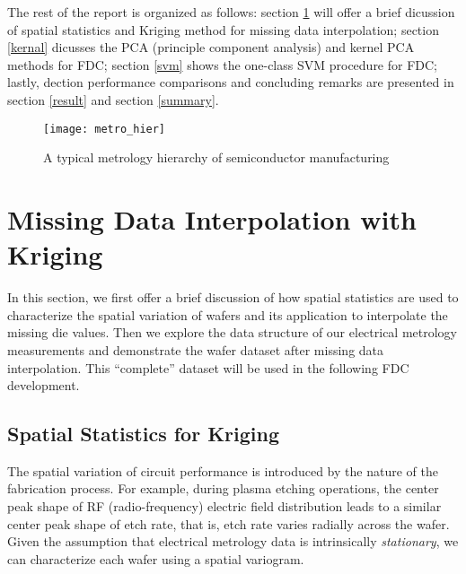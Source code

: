 \documentclass[12pt]{article}
\numberwithin{equation}{section}
\numberwithin{table}{section}
\numberwithin{figure}{section}
\begin{document}
The rest of the report is organized as follows: section \ref{kriging}
will offer a brief dicussion of spatial statistics and Kriging method
for missing data interpolation; section \ref{kernal} dicusses the PCA
(principle component analysis) and kernel PCA methods for FDC; section
\ref{svm} shows the one-class SVM procedure for FDC; lastly, dection
performance comparisons and concluding remarks are presented in
section \ref{result} and section \ref{summary}.

\begin{figure} \centering
  \texttt{[image: metro\_hier]}
  \caption{A typical metrology hierarchy of semiconductor manufacturing}
  \label{metro_hier}
\end{figure}


\section{Missing Data Interpolation with Kriging} \label{kriging}

\hspace{12 pt}
In this section, we first offer a brief discussion of how spatial
statistics are used to characterize the spatial variation of wafers
and its application to interpolate the missing die values. Then we
explore the data structure of our electrical metrology
measurements and demonstrate the wafer dataset after missing data
interpolation. This ``complete'' dataset will be used in the following
FDC development.  


\subsection{Spatial Statistics for Kriging} \label{spatial}

\hspace{12 pt}
The spatial variation of circuit performance is introduced by the
nature of the fabrication process. For example, during plasma etching
operations, the center peak shape of RF (radio-frequency) electric
field distribution leads to a similar center peak shape of etch rate,
that is, etch rate varies radially across the wafer\cite{dkPHD}. Given
the assumption that electrical metrology data is intrinsically
\emph{stationary}, we can characterize each wafer using a spatial
variogram.
\end{document}
